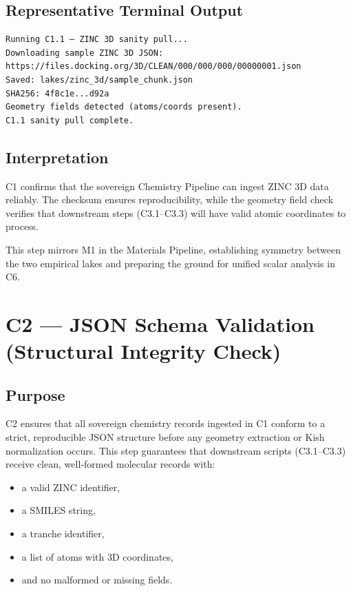 \documentclass[11pt, letterpaper, openany]{book}
\begin{document}
\subsection*{Representative Terminal Output}
\begin{lstlisting}[style=terminal]
Running C1.1 — ZINC 3D sanity pull...
Downloading sample ZINC 3D JSON:
https://files.docking.org/3D/CLEAN/000/000/000/00000001.json
Saved: lakes/zinc_3d/sample_chunk.json
SHA256: 4f8c1e...d92a
Geometry fields detected (atoms/coords present).
C1.1 sanity pull complete.
\end{lstlisting}

\subsection*{Interpretation}
C1 confirms that the sovereign Chemistry Pipeline can ingest ZINC 3D data
reliably. The checksum ensures reproducibility, while the geometry field check
verifies that downstream steps (C3.1–C3.3) will have valid atomic coordinates to
process.

This step mirrors M1 in the Materials Pipeline, establishing symmetry between the
two empirical lakes and preparing the ground for unified scalar analysis in C6.


\section{C2 — JSON Schema Validation (Structural Integrity Check)}

\subsection*{Purpose}
C2 ensures that all sovereign chemistry records ingested in C1 conform to a
strict, reproducible JSON structure before any geometry extraction or Kish
normalization occurs. This step guarantees that downstream scripts (C3.1–C3.3)
receive clean, well‑formed molecular records with:

\begin{itemize}
    \item a valid ZINC identifier,
    \item a SMILES string,
    \item a tranche identifier,
    \item a list of atoms with 3D coordinates,
    \item and no malformed or missing fields.
\end{itemize}
\end{document}

